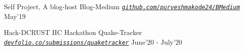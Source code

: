 
\begin{cventries}


  

  \cventry
  {Self Project, A blog-host}
  {Blog-Medium}
   {\emph{\texttt{\href{https://github.com/purveshmakode24/BMedium}{github.com/purveshmakode24/BMedium}}}}
  {May'19}
  {
    \begin{cvitems}
        \vspace{1mm}
    \end{cvitems}
  } 
  
  \vspace{0.5mm} %
  
  \cventry
  {Hack-DCRUST IIC Hackathon}
  {Quake-Tracker}
   {\emph{\texttt{\href{https://devfolio.co/submissions/quaketracker}{devfolio.co/submissions/quaketracker}}}}
  {June'20 - July'20}
  {
    \begin{cvitems}
        \vspace{1mm}
    \end{cvitems}
  }
  

\end{cventries}
